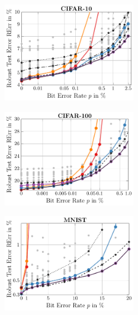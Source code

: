\begin{figure}[t]
	\centering
	\vspace*{-0.1cm}
	\hspace*{-0.3cm}
	\begin{subfigure}{0.32\textwidth}
		\centering
		\includegraphics[width=5.75cm]{c10_pareto_8bit}
	\end{subfigure}
	\hfill
	\begin{subfigure}{0.32\textwidth}
		\centering
		\includegraphics[width=5.75cm]{c100_pareto_8bit}
	\end{subfigure}
	\hfill
	\begin{subfigure}{0.32\textwidth}
		\centering
		\includegraphics[width=5.75cm]{m_pareto_8bit}
	\end{subfigure}
	

\end{figure}
